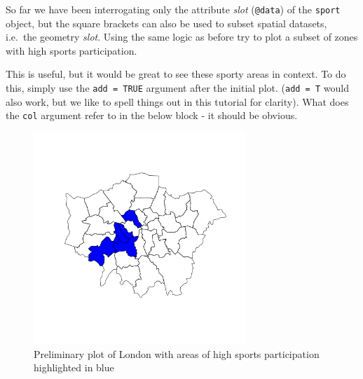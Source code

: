\documentclass[]{article}
\newenvironment{Shaded}{}{}
\newcommand{\KeywordTok}[1]{\textcolor[rgb]{0.00,0.44,0.13}{\textbf{{#1}}}}
\newcommand{\DataTypeTok}[1]{\textcolor[rgb]{0.56,0.13,0.00}{{#1}}}
\newcommand{\DecValTok}[1]{\textcolor[rgb]{0.25,0.63,0.44}{{#1}}}
\newcommand{\StringTok}[1]{\textcolor[rgb]{0.25,0.44,0.63}{{#1}}}
\newcommand{\CommentTok}[1]{\textcolor[rgb]{0.38,0.63,0.69}{\textit{{#1}}}}
\newcommand{\OtherTok}[1]{\textcolor[rgb]{0.00,0.44,0.13}{{#1}}}
\newcommand{\NormalTok}[1]{{#1}}
\let\Oldincludegraphics\includegraphics
\renewcommand{\includegraphics}[1]{\Oldincludegraphics[width=8cm]{#1}}
\begin{document}
So far we have been interrogating only the attribute \emph{slot}
(\texttt{@data}) of the \texttt{sport} object, but the square brackets
can also be used to subset spatial datasets, i.e.~the geometry
\emph{slot}. Using the same logic as before try to plot a subset of
zones with high sports participation.

\begin{Shaded}
\end{Shaded}
This is useful, but it would be great to see these sporty areas in
context. To do this, simply use the \texttt{add = TRUE} argument after
the initial plot. (\texttt{add = T} would also work, but we like to
spell things out in this tutorial for clarity). What does the
\texttt{col} argument refer to in the below block - it should be
obvious.

\begin{Shaded}
\end{Shaded}
\begin{figure}[htbp]
\centering
\includegraphics{figure/Preliminary_plot_of_London_with_areas_of_high_sports_participation_highlighted_in_blue.png}
\caption{Preliminary plot of London with areas of high
sports participation highlighted in blue}
\end{figure}
\end{document}
